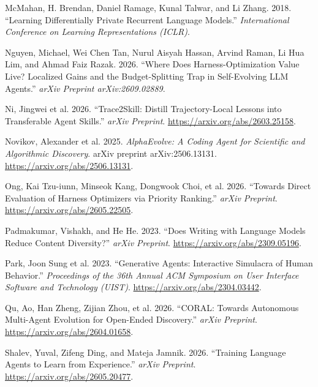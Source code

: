\documentclass[
]{article}
\newlength{\cslhangindent}
\newenvironment{CSLReferences}[2] %
 {\begin{list}{}{%
  \setlength{\itemindent}{0pt}
  \setlength{\leftmargin}{0pt}
  \setlength{\parsep}{0pt}
  \ifodd #1
   \setlength{\leftmargin}{\cslhangindent}
   \setlength{\itemindent}{-1\cslhangindent}
  \fi
  \setlength{\itemsep}{#2\baselineskip}}}
 {\end{list}}
\begin{document}
\begin{CSLReferences}{1}{1}
McMahan, H. Brendan, Daniel Ramage, Kunal Talwar, and Li Zhang. 2018.
{``Learning Differentially Private Recurrent Language Models.''}
\emph{International Conference on Learning Representations (ICLR)}.

Nguyen, Michael, Wei Chen Tan, Nurul Aisyah Hassan, Arvind Raman, Li Hua
Lim, and Ahmad Faiz Razak. 2026. {``Where Does Harness-Optimization
Value Live? {Localized} Gains and the Budget-Splitting Trap in
Self-Evolving {LLM} Agents.''} \emph{arXiv Preprint arXiv:2609.02889}.

{Ni, Jingwei et al.} 2026. {``{Trace2Skill}: Distill Trajectory-Local
Lessons into Transferable Agent Skills.''} \emph{arXiv Preprint}.
\url{https://arxiv.org/abs/2603.25158}.

{Novikov, Alexander et al.} 2025. \emph{{AlphaEvolve}: A Coding Agent
for Scientific and Algorithmic Discovery}. arXiv preprint
arXiv:2506.13131. \url{https://arxiv.org/abs/2506.13131}.

Ong, Kai Tzu-iunn, Minseok Kang, Dongwook Choi, et al. 2026. {``Towards
Direct Evaluation of Harness Optimizers via Priority Ranking.''}
\emph{arXiv Preprint}. \url{https://arxiv.org/abs/2605.22505}.

Padmakumar, Vishakh, and He He. 2023. {``Does Writing with Language
Models Reduce Content Diversity?''} \emph{arXiv Preprint}.
\url{https://arxiv.org/abs/2309.05196}.

{Park, Joon Sung et al.} 2023. {``Generative Agents: Interactive
Simulacra of Human Behavior.''} \emph{Proceedings of the 36th Annual ACM
Symposium on User Interface Software and Technology (UIST)}.
\url{https://arxiv.org/abs/2304.03442}.

Qu, Ao, Han Zheng, Zijian Zhou, et al. 2026. {``{CORAL}: Towards
Autonomous Multi-Agent Evolution for Open-Ended Discovery.''}
\emph{arXiv Preprint}. \url{https://arxiv.org/abs/2604.01658}.

Shalev, Yuval, Zifeng Ding, and Mateja Jamnik. 2026. {``Training
Language Agents to Learn from Experience.''} \emph{arXiv Preprint}.
\url{https://arxiv.org/abs/2605.20477}.


\end{CSLReferences}
\end{document}
